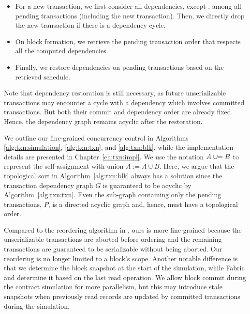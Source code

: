 \begin{itemize}

\item For a new transaction, we first consider all dependencies, except
  , among all pending transactions (including the new
  transaction).
  Then, we directly drop the new transaction if there is a dependency cycle.

\item On block formation, we retrieve the pending transaction order that
  respects all the computed dependencies.

\item Finally, we restore  dependencies on pending transactions
  based on the retrieved schedule.

\end{itemize}

Note that  dependency restoration is still necessary, 
%
as future unserializable transactions may encounter a cycle with a 
dependency which involves committed transactions. 
%
But both their commit and dependency order are already fixed.
%
Hence, the dependency graph remains acyclic after the restoration.

We outline our fine-grained concurrency control in Algorithms \ref{alg:txn:simulation}, \ref{alg:txn:txn}, and \ref{alg:txn:blk}, while the implementation details are presented in Chapter~\ref{ch:txn:impl}.
%
We use the notation $A \mathrel{{\cup}{=}} B$ to represent the self-assignment with union $A := A \cup B$.
%
Here, we argue that the topological sort in Algorithm~\ref{alg:txn:blk} always has a solution
since the transaction dependency graph $G$ is guaranteed to be acyclic by Algorithm~\ref{alg:txn:txn}.
%
Even the sub-graph containing only the pending transactions, $P$, is a directed
acyclic graph and, hence, must have a topological order.

Compared to the reordering algorithm in {\fabricPlusplus}, ours is more fine-grained
because the unserializable transactions are aborted before ordering and the
remaining transactions are guaranteed to be serializable without being aborted.
%
Our reordering is no longer limited to a block's scope.
Another notable difference is that we determine the block snapshot at the start
of the simulation, while Fabric and {\fabricPlusplus} determine it based on the last read
operation.
%
We allow block commit during the contract simulation for more
parallelism, but this may introduce stale snapshots when previously read records
are updated by committed transactions during the simulation.

